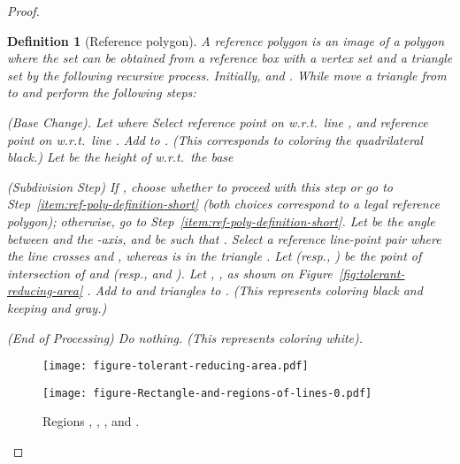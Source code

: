 \documentclass[11pt,english]{article}
\renewenvironment{enumerate}[1]{\begin{compactenum}#1}{\end{compactenum}}
\newtheorem{definition}{Definition}[section]
\numberwithin{figure}{section}
\begin{document}
\begin{proof}
\begin{definition}[Reference polygon]\label{def:reference-polygons}
A {\em reference polygon} is an image of a polygon  where the set
 can be obtained from a reference box with a vertex set  and a triangle set  by the following recursive process.
Initially,  and . While  move a triangle  from  to  and
perform the following steps:


\begin{enumerate}
\item\label{item:ref-poly-definition} {\sf (Base Change).} Let  where
  Select reference point  on  w.r.t.\ line , and reference point  on  w.r.t.\ line . Add  to . (This corresponds to coloring the quadrilateral  black.) Let  be the height of  w.r.t.\ the base 



\item\label{item:ref-poly-definition-tall} {\sf (Subdivision Step)} If , choose whether to proceed with this step or go to Step~\ref{item:ref-poly-definition-short} (both choices correspond to a legal reference polygon); otherwise, go to Step~\ref{item:ref-poly-definition-short}. Let  be the angle between  and the -axis, and  be such that . Select a reference line-point pair  where the line  crosses  and , whereas  is in the triangle . Let  (resp., ) be the point of intersection of  and  (resp.,  and ). Let , \ifnum{}
, as shown on Figure~\ref{fig:tolerant-reducing-area}\fi
. Add  to  and triangles  to . (This represents coloring  black and keeping  and  gray.)

\item\label{item:ref-poly-definition-short} {\sf (End of Processing)} Do nothing. (This represents coloring  white).
\end{enumerate}
\end{definition}
\ifnum{}
\begin{figure}[ht]
\begin{minipage}[b]{0.55\linewidth}
\centering
\texttt{[image: figure-tolerant-reducing-area.pdf]}
\caption{ An illustration to Definition~\ref{def:reference-polygons}: Triangle .}
\label{fig:tolerant-reducing-area}
\end{minipage}
\hspace{0.01\linewidth}
\begin{minipage}[b]{0.48\linewidth}
\centering
\texttt{[image: figure-Rectangle-and-regions-of-lines-0.pdf]}
\caption{ Regions , , , and .}
\label{fig:w-regions}
\end{minipage}
\end{figure}
\fi


\end{proof}
\end{document}
